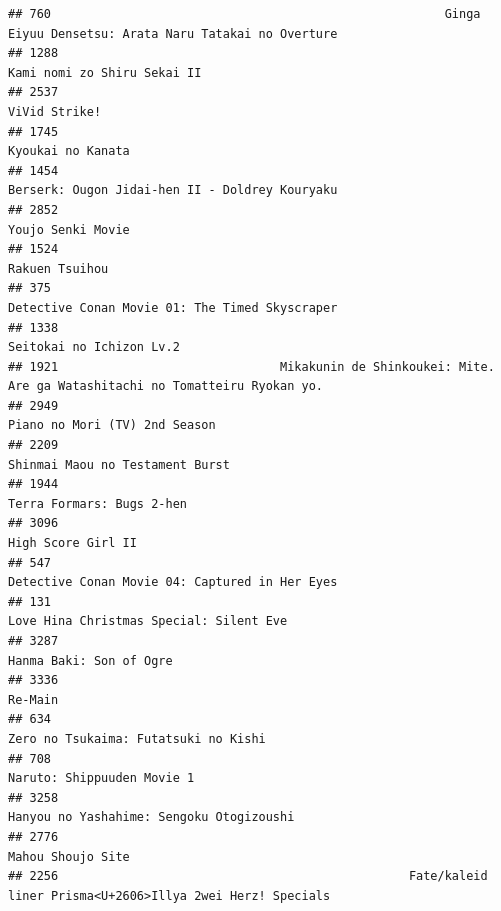 \documentclass[
]{article}
\begin{document}
\begin{verbatim}
## 760                                                       Ginga Eiyuu Densetsu: Arata Naru Tatakai no Overture
## 1288                                                                               Kami nomi zo Shiru Sekai II
## 2537                                                                                             ViVid Strike!
## 1745                                                                                         Kyoukai no Kanata
## 1454                                                            Berserk: Ougon Jidai-hen II - Doldrey Kouryaku
## 2852                                                                                         Youjo Senki Movie
## 1524                                                                                            Rakuen Tsuihou
## 375                                                             Detective Conan Movie 01: The Timed Skyscraper
## 1338                                                                                  Seitokai no Ichizon Lv.2
## 1921                               Mikakunin de Shinkoukei: Mite. Are ga Watashitachi no Tomatteiru Ryokan yo.
## 2949                                                                             Piano no Mori (TV) 2nd Season
## 2209                                                                           Shinmai Maou no Testament Burst
## 1944                                                                                 Terra Formars: Bugs 2-hen
## 3096                                                                                        High Score Girl II
## 547                                                             Detective Conan Movie 04: Captured in Her Eyes
## 131                                                                    Love Hina Christmas Special: Silent Eve
## 3287                                                                                   Hanma Baki: Son of Ogre
## 3336                                                                                                   Re-Main
## 634                                                                       Zero no Tsukaima: Futatsuki no Kishi
## 708                                                                                 Naruto: Shippuuden Movie 1
## 3258                                                                  Hanyou no Yashahime: Sengoku Otogizoushi
## 2776                                                                                         Mahou Shoujo Site
## 2256                                                 Fate/kaleid liner Prisma<U+2606>Illya 2wei Herz! Specials

\end{verbatim}
\end{document}
